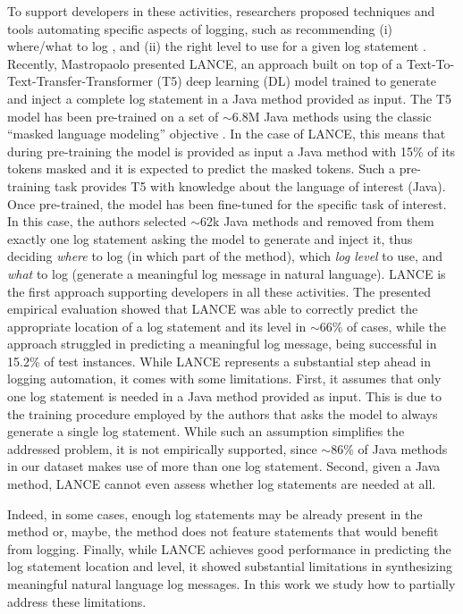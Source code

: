 To support developers in these activities, researchers proposed techniques and tools automating specific aspects of logging, such as recommending (i) where/what to log \cite{yuan2010sherlog,jia2018smartlog,li2018studying,li2020shall}, and (ii) the right level to use for a given log statement \cite{yuan2012characterizing,oliner2012advances,li2017log,li2020qualitative,li2021deeplv}. Recently, Mastropaolo \etal \cite{mastropaolo2022using} presented LANCE, an approach built on top of a Text-To-Text-Transfer-Transformer (T5) deep learning (DL) model \cite{raffel2019exploring} trained to generate and inject a complete log statement in a Java method provided as input. The T5 model has been pre-trained on a set of $\sim$6.8M Java methods using the classic ``masked language modeling'' objective \cite{raffel2019exploring}. In the case of LANCE, this means that during pre-training the model is provided as input a Java method with 15\% of its tokens masked and it is expected to predict the masked tokens. Such a pre-training task provides T5 with knowledge about the language of interest (\ie Java). Once pre-trained, the model has been fine-tuned for the specific task of interest. In this case, the authors selected $\sim$62k Java methods and removed from them exactly one log statement asking the model to generate and inject it, thus deciding \emph{where} to log (\ie in which part of the method), which \emph{log level} to use, and \emph{what} to log (\ie generate a meaningful log message in natural language). LANCE is the first approach supporting developers in all these activities. The presented empirical evaluation showed that LANCE was able to correctly predict the appropriate location of a log statement and its level in $\sim$66\% of cases, while the approach struggled in predicting a meaningful log message, being successful in 15.2\% of test instances. While LANCE represents a substantial step ahead in logging automation, it comes with some limitations. First, it assumes that only one log statement is needed in a Java method provided as input. This is due to the training procedure employed by the authors that asks the model to always generate a single log statement. While such an assumption simplifies the addressed problem, it is not empirically supported, since $\sim$86\% of Java methods in our dataset makes use of more than one log statement. Second, given a Java method, LANCE cannot even assess whether log statements are needed at all. 

\eject

Indeed, in some cases, enough log statements may be already present in the method or, maybe, the method does not feature statements that would benefit from logging. Finally,  while LANCE achieves good performance in predicting the log statement location and level, it showed substantial limitations in synthesizing meaningful natural language log messages. In this work we study how to partially address these limitations.

